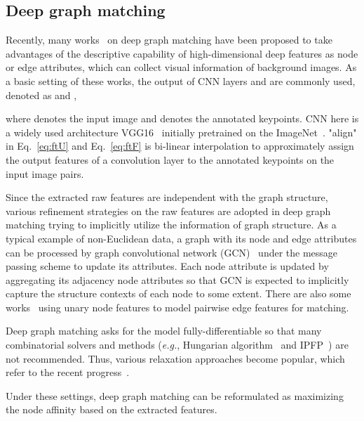 \documentclass[final]{cvpr}
\begin{document}
\subsection{Deep graph matching}
 Recently, many works~\cite{fey2020deep,wang2019learning,wang2020combinatorial,yu2020learning,rolinek2020deep} on deep graph matching have been proposed to take advantages of the descriptive capability of high-dimensional deep features as node or edge attributes, which can collect visual information of background images. As a basic setting of these works, the output of CNN layers  and  are commonly used, denoted as  and ,

where  denotes the input image and  denotes the annotated keypoints. CNN here is a widely used architecture VGG16~\cite{simonyan2014very} initially pretrained on the ImageNet~\cite{russakovsky2015imagenet}. "align" in Eq.~\eqref{eq:ftU} and Eq.~\eqref{eq:ftF} is bi-linear interpolation to approximately assign the output features of a convolution layer to the annotated keypoints on the input image pairs.


Since the extracted raw features are independent with the graph structure, various refinement strategies on the raw features are adopted in deep graph matching trying to implicitly utilize the information of graph structure.
As a typical example of non-Euclidean data, a graph with its node and edge attributes can be processed by graph convolutional network (GCN)~\cite{kipf2016semi} under the message passing scheme to update its attributes. Each node attribute is updated by aggregating its adjacency node attributes so that GCN is expected to implicitly capture the structure contexts of each node to some extent. There are also some works~\cite{rolinek2020deep,yu2020learning} using unary node features to model pairwise edge features for matching.


Deep graph matching asks for the model fully-differentiable so that many combinatorial solvers and methods ({\em e.g.}, Hungarian algorithm~\cite{kuhn1955hungarian} and IPFP~\cite{leordeanu2009integer}) are not recommended. Thus, various relaxation approaches become popular, which refer to the recent progress~\cite{rolinek2020deep,wang2019learning,wang2020learning}.


Under these settings, deep graph matching can be reformulated as maximizing the node affinity based on the extracted features.
\end{document}
